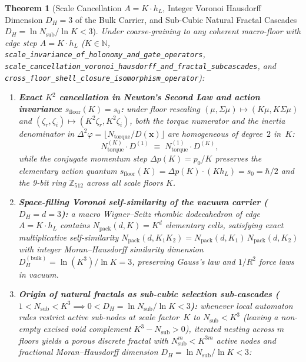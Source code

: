 \documentclass[11pt,a4paper]{article}
\theoremstyle{plain}
\newtheorem{theorem}{Theorem}[section]
\theoremstyle{definition}
\begin{document}
\begin{theorem}[Scale Cancellation $A = K\cdot h_L$, Integer Voronoi Hausdorff Dimension $D_H = 3$ of the Bulk Carrier, and Sub-Cubic Natural Fractal Cascades $D_H = \ln N_{\mathrm{sub}}/\ln K < 3$]
\label{thm:scale-cancellation-fractals}
Under coarse-graining to any coherent macro-floor with edge step $A = K\cdot h_L$ ($K\in\mathbb{N}$, \texttt{scale\_invariance\_of\_holonomy\_and\_gate\_operators}, \texttt{scale\_cancellation\_voronoi\_hausdorff\_and\_fractal\_subcascades}, and \texttt{cross\_floor\_shell\_closure\_isomorphism\_operator}):
\begin{enumerate}[label=\textbf{(\arabic*)},leftmargin=*]
\item \textbf{Exact $K^2$ cancellation in Newton's Second Law and action invariance $s_{\mathrm{floor}}(K) = s_0$:}
  under floor rescaling $(\mu,\Sigma\mu)\mapsto(K\mu,K\Sigma\mu)$ and $(\zeta_r,\zeta_i)\mapsto(K^2\zeta_r,K^2\zeta_i)$, both the torque numerator and the inertia denominator in $\Delta^2\varphi = \lfloor N_{\mathrm{torque}}/D(\mathbf{x})\rfloor$ are homogeneous of degree~$2$ in~$K$:
  \begin{equation}
    \label{eq:scale-k2-cancel}
    N_{\mathrm{torque}}^{(K)}\cdot D^{(1)} \;\equiv\; N_{\mathrm{torque}}^{(1)}\cdot D^{(K)},
  \end{equation}
  while the conjugate momentum step $\Delta p(K) = p_0/K$ preserves the elementary action quantum $s_{\mathrm{floor}}(K) = \Delta p(K)\cdot(K h_L) = s_0 = \hbar/2$ and the 9-bit ring $\mathbb{Z}_{512}$ across all scale floors $K$.
\item \textbf{Space-filling Voronoi self-similarity of the vacuum carrier ($D_H = d = 3$):}
  a macro Wigner--Seitz rhombic dodecahedron of edge $A = K\cdot h_L$ contains $N_{\mathrm{pack}}(d,K) = K^d$ elementary cells, satisfying exact multiplicative self-similarity $N_{\mathrm{pack}}(d,K_1 K_2) = N_{\mathrm{pack}}(d,K_1)\,N_{\mathrm{pack}}(d,K_2)$ with integer Moran--Hausdorff similarity dimension $D_H^{(\mathrm{bulk})} = \ln(K^3)/\ln K = 3$, preserving Gauss's law and $1/R^2$ force laws in vacuum.
\item \textbf{Origin of natural fractals as sub-cubic selection sub-cascades ($1 < N_{\mathrm{sub}} < K^3 \implies 0 < D_H = \ln N_{\mathrm{sub}}/\ln K < 3$):}
  whenever local automaton rules restrict active sub-nodes at scale factor~$K$ to $N_{\mathrm{sub}} < K^3$ (leaving a non-empty excised void complement $K^3 - N_{\mathrm{sub}} > 0$), iterated nesting across $m$ floors yields a porous discrete fractal with $N_{\mathrm{sub}}^m < K^{3m}$ active nodes and fractional Moran--Hausdorff dimension $D_H = \ln N_{\mathrm{sub}}/\ln K < 3$:

\end{enumerate}
\end{theorem}
\end{document}
